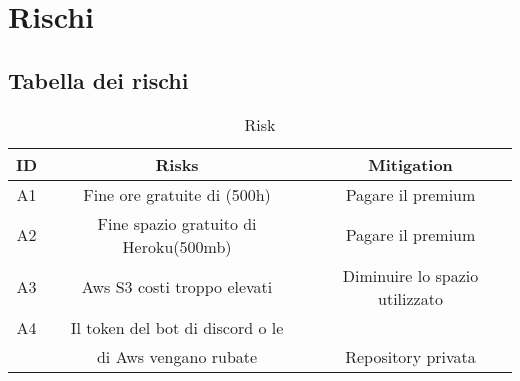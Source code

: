 \newpage
\section{Rischi\label{section:Risks}}
\subsection{Tabella dei rischi}
\begin{table}[h!]
    \begin{center}
    \begin{tabular}{ |c|c|c| } 
     \hline
     \textbf{ID} & \textbf{Risks} & \textbf{Mitigation}  \\ [0.5ex] 
     \hline
     A1 & Fine ore gratuite di (500h) & Pagare il premium\\
     \hline
     A2 & Fine spazio gratuito di Heroku(500mb) & Pagare il premium \\
      \hline
     A3 & Aws S3 costi troppo elevati & Diminuire lo spazio utilizzato\\
     \hline
     A4 & Il token del bot di discord o le &\\
     & di Aws vengano rubate & Repository privata\\
     \hline
    \end{tabular}
    \end{center}
    \caption{Risk}
    \label{req}
    \end{table}
